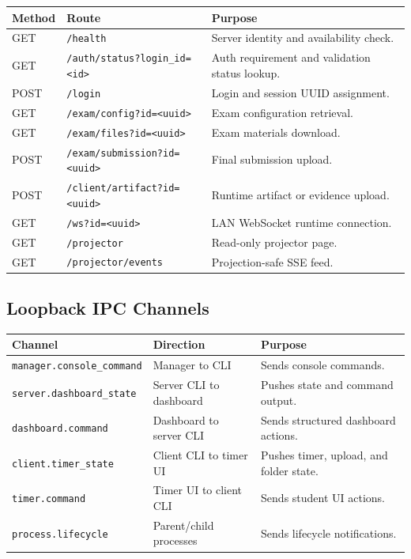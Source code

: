\documentclass[12pt,a4paper]{article}
\begin{document}
\begin{longtable}{L{0.15\textwidth} L{0.30\textwidth} L{0.45\textwidth}}
\textbf{Method} & \textbf{Route} & \textbf{Purpose} \\
\hline
GET & \texttt{/health} & Server identity and availability check. \\
GET & \texttt{/auth/status?login\_id=<id>} & Auth requirement and validation status lookup. \\
POST & \texttt{/login} & Login and session UUID assignment. \\
GET & \texttt{/exam/config?id=<uuid>} & Exam configuration retrieval. \\
GET & \texttt{/exam/files?id=<uuid>} & Exam materials download. \\
POST & \texttt{/exam/submission?id=<uuid>} & Final submission upload. \\
POST & \texttt{/client/artifact?id=<uuid>} & Runtime artifact or evidence upload. \\
GET & \texttt{/ws?id=<uuid>} & LAN WebSocket runtime connection. \\
GET & \texttt{/projector} & Read-only projector page. \\
GET & \texttt{/projector/events} & Projection-safe SSE feed. \\
\end{longtable}

\subsection{Loopback IPC Channels}

\begin{longtable}{L{0.30\textwidth} L{0.25\textwidth} L{0.35\textwidth}}
\textbf{Channel} & \textbf{Direction} & \textbf{Purpose} \\
\hline
\texttt{manager.console\_command} & Manager to CLI & Sends console commands. \\
\texttt{server.dashboard\_state} & Server CLI to dashboard & Pushes state and command output. \\
\texttt{dashboard.command} & Dashboard to server CLI & Sends structured dashboard actions. \\
\texttt{client.timer\_state} & Client CLI to timer UI & Pushes timer, upload, and folder state. \\
\texttt{timer.command} & Timer UI to client CLI & Sends student UI actions. \\
\texttt{process.lifecycle} & Parent/child processes & Sends lifecycle notifications. \\
\end{longtable}
\end{document}
